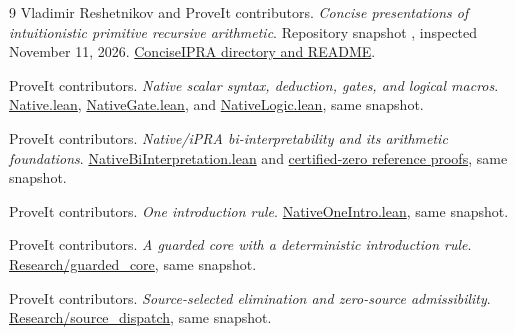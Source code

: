 \begin{thebibliography}{9}
Vladimir Reshetnikov and ProveIt contributors.
\emph{Concise presentations of intuitionistic primitive recursive arithmetic}.
Repository snapshot
, inspected November 11, 2026.
\href{https://github.com/VladimirReshetnikov/ProveIt/tree/a4e5e96c456303cf231eab2aeeb3291d8889833f/Logic/PrimitiveRecursiveArithmetic/ConciseIPRA}{ConciseIPRA directory and README}.

ProveIt contributors.
\emph{Native scalar syntax, deduction, gates, and logical macros}.
\href{https://github.com/VladimirReshetnikov/ProveIt/blob/a4e5e96c456303cf231eab2aeeb3291d8889833f/Logic/PrimitiveRecursiveArithmetic/ConciseIPRA/Lean/ConciseIPRA/Native.lean}{Native.lean},
\href{https://github.com/VladimirReshetnikov/ProveIt/blob/a4e5e96c456303cf231eab2aeeb3291d8889833f/Logic/PrimitiveRecursiveArithmetic/ConciseIPRA/Lean/ConciseIPRA/NativeGate.lean}{NativeGate.lean}, and
\href{https://github.com/VladimirReshetnikov/ProveIt/blob/a4e5e96c456303cf231eab2aeeb3291d8889833f/Logic/PrimitiveRecursiveArithmetic/ConciseIPRA/Lean/ConciseIPRA/NativeLogic.lean}{NativeLogic.lean}, same snapshot.

ProveIt contributors.
\emph{Native/iPRA bi-interpretability and its arithmetic foundations}.
\href{https://github.com/VladimirReshetnikov/ProveIt/blob/a4e5e96c456303cf231eab2aeeb3291d8889833f/Logic/PrimitiveRecursiveArithmetic/ConciseIPRA/Lean/ConciseIPRA/NativeBiInterpretation.lean}{NativeBiInterpretation.lean} and
\href{https://github.com/VladimirReshetnikov/ProveIt/tree/a4e5e96c456303cf231eab2aeeb3291d8889833f/Logic/PrimitiveRecursiveArithmetic/ConciseIPRA/Research/certified_zero/reference}{certified-zero reference proofs}, same snapshot.

ProveIt contributors.
\emph{One introduction rule}.
\href{https://github.com/VladimirReshetnikov/ProveIt/blob/a4e5e96c456303cf231eab2aeeb3291d8889833f/Logic/PrimitiveRecursiveArithmetic/ConciseIPRA/Lean/ConciseIPRA/NativeOneIntro.lean}{NativeOneIntro.lean}, same snapshot.

ProveIt contributors.
\emph{A guarded core with a deterministic introduction rule}.
\href{https://github.com/VladimirReshetnikov/ProveIt/tree/a4e5e96c456303cf231eab2aeeb3291d8889833f/Logic/PrimitiveRecursiveArithmetic/ConciseIPRA/Research/guarded_core}{Research/guarded\_core}, same snapshot.

ProveIt contributors.
\emph{Source-selected elimination and zero-source admissibility}.
\href{https://github.com/VladimirReshetnikov/ProveIt/tree/a4e5e96c456303cf231eab2aeeb3291d8889833f/Logic/PrimitiveRecursiveArithmetic/ConciseIPRA/Research/source_dispatch}{Research/source\_dispatch}, same snapshot.


\end{thebibliography}
